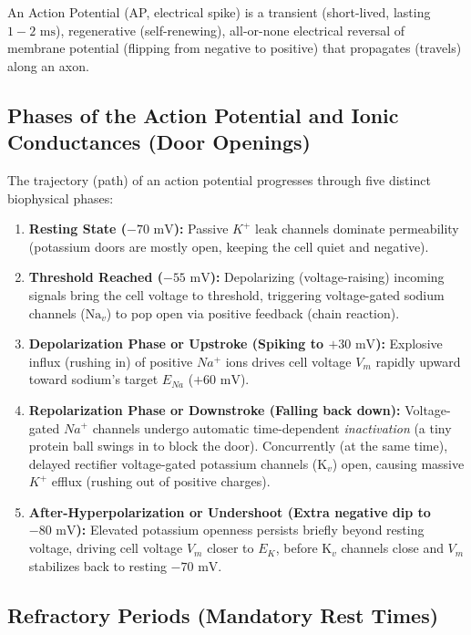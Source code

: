 \documentclass[10pt,journal,compsoc,onecolumn]{IEEEtran}
\begin{document}
An Action Potential (AP, electrical spike) is a transient (short-lived, lasting $1-2\text{ ms}$), regenerative (self-renewing), all-or-none electrical reversal of membrane potential (flipping from negative to positive) that propagates (travels) along an axon.

\subsection{Phases of the Action Potential and Ionic Conductances (Door Openings)}

The trajectory (path) of an action potential progresses through five distinct biophysical phases:

\begin{enumerate}
    \item \textbf{Resting State ($-70\text{ mV}$):} Passive $K^+$ leak channels dominate permeability (potassium doors are mostly open, keeping the cell quiet and negative).
    \item \textbf{Threshold Reached ($-55\text{ mV}$):} Depolarizing (voltage-raising) incoming signals bring the cell voltage to threshold, triggering voltage-gated sodium channels ($\text{Na}_v$) to pop open via positive feedback (chain reaction).
    \item \textbf{Depolarization Phase or Upstroke (Spiking to $+30\text{ mV}$):} Explosive influx (rushing in) of positive $Na^+$ ions drives cell voltage $V_m$ rapidly upward toward sodium's target $E_{Na}$ ($+60\text{ mV}$).
    \item \textbf{Repolarization Phase or Downstroke (Falling back down):} Voltage-gated $Na^+$ channels undergo automatic time-dependent \emph{inactivation} (a tiny protein ball swings in to block the door). Concurrently (at the same time), delayed rectifier voltage-gated potassium channels ($\text{K}_v$) open, causing massive $K^+$ efflux (rushing out of positive charges).
    \item \textbf{After-Hyperpolarization or Undershoot (Extra negative dip to $-80\text{ mV}$):} Elevated potassium openness persists briefly beyond resting voltage, driving cell voltage $V_m$ closer to $E_K$, before $\text{K}_v$ channels close and $V_m$ stabilizes back to resting $-70\text{ mV}$.
\end{enumerate}

\subsection{Refractory Periods (Mandatory Rest Times)}
\end{document}
